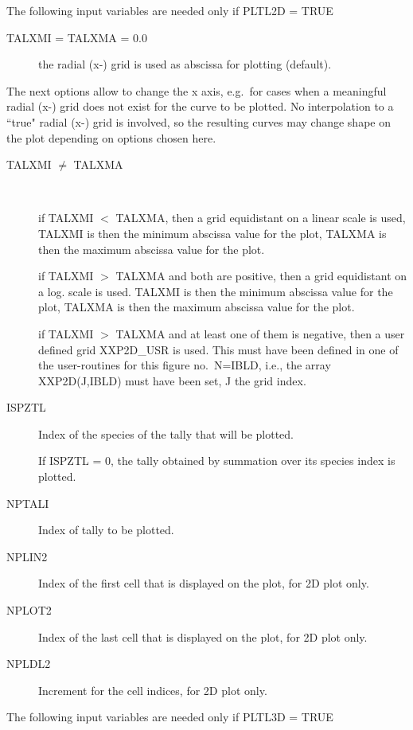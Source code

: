 The following input variables are needed only if PLTL2D = TRUE

\begin{description}
  \item[TALXMI = TALXMA = 0.0] the radial (x-) grid is used
        as abscissa for plotting (default).
\end{description}
The next options allow to change the x axis, e.g.\ for cases when a meaningful
radial (x-) grid does not exist for the curve to be plotted.
No interpolation to a ``true" radial (x-) grid is involved, so the resulting
curves may change shape on the plot depending on options chosen here.
\begin{description}
  \item[TALXMI $\neq$ TALXMA] ~

        if TALXMI $<$ TALXMA, then a grid equidistant on a linear scale is used, TALXMI
        is then the minimum abscissa value for the plot, TALXMA is then the maximum
        abscissa value for the plot.

        if TALXMI $>$ TALXMA and both are positive, then a grid equidistant on
        a
        log. scale is used.
        TALXMI is then the minimum abscissa value for the plot, TALXMA is then the
        maximum abscissa value for the plot.

        if TALXMI $>$ TALXMA and at least one of them is negative,
        then a user defined grid XXP2D\_USR is used.
        This must have been defined in one of the user-routines for this figure no.\
        N=IBLD, i.e., the array XXP2D(J,IBLD) must have been set, J the grid index.
  \item[ISPZTL] Index of the species of the tally that will be plotted.

        If ISPZTL = 0, the tally obtained by summation over its species index is
        plotted.
  \item[NPTALI] Index of tally to be plotted.
  \item[NPLIN2] Index of the first cell that is displayed on the plot, for 2D
        plot only.
  \item[NPLOT2] Index of the last cell that is displayed on the plot, for 2D plot
        only.
  \item[NPLDL2] Increment for the cell indices, for 2D plot only.
\end{description}

The following input variables are needed only if PLTL3D = TRUE

